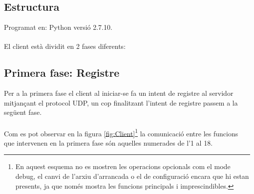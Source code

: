 \documentclass[11pt]{article}
\begin{document}
\subsection{Estructura}
Programat en: Python versió 2.7.10.\\\\
El client està dividit en 2 fases diferents:
\subsection*{Primera fase: Registre}
Per a la primera fase el client al iniciar-se fa un intent de registre al servidor mitjançant el protocol UDP, un cop finalitzant l'intent de registre passem a la següent fase.
\\\\
Com es pot observar en la figura \ref{fig:Client}\footnote{En aquest esquema no es mostren les operacions opcionals com el mode debug, el canvi de l'arxiu d'arrancada o el de configuració encara que hi estan presents, ja que només mostra les funcions principals i imprescindibles.} la comunicació entre les funcions que intervenen en la primera fase són aquelles numerades de l'1 al 18.
\end{document}
